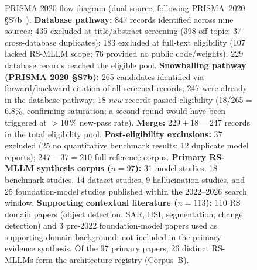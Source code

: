 \begin{figure}[h]
\begin{tikzpicture}
\end{tikzpicture}
\caption{PRISMA 2020 flow diagram (dual-source, following PRISMA~2020 \S{}S7b~\cite{page2021prisma}).
\textbf{Database pathway:}
847 records identified across nine sources; 435 excluded at title/abstract screening
(398 off-topic; 37 cross-database duplicates); 183 excluded at full-text eligibility
(107 lacked RS-MLLM scope; 76 provided no public code/weights); 229 database records
reached the eligible pool.
\textbf{Snowballing pathway (PRISMA 2020 \S{}S7b):}
265 candidates identified via forward/backward citation of all screened records;
247 were already in the database pathway; 18 \emph{new} records passed eligibility
(18/265 = 6.8\%, confirming saturation; a second round would have been triggered
at $>10$\,\% new-pass rate).
\textbf{Merge:} $229 + 18 = 247$ records in the total eligibility pool.
\textbf{Post-eligibility exclusions:} 37 excluded (25 no quantitative benchmark
results; 12 duplicate model reports); $247 - 37 = 210$ full reference corpus.
\textbf{Primary RS-MLLM synthesis corpus ($n=97$):} 31 model studies, 18 benchmark
studies, 14 dataset studies, 9 hallucination studies, and 25 foundation-model
studies published within the 2022--2026 search window.
\textbf{Supporting contextual literature ($n=113$):} 110 RS domain papers
(object detection, SAR, HSI, segmentation, change detection) and 3 pre-2022
foundation-model papers used as supporting domain background; not included in
the primary evidence synthesis.
Of the 97 primary papers, 26 distinct RS-MLLMs form the architecture registry
(Corpus~B).}\label{fig:prisma}
\end{figure}

